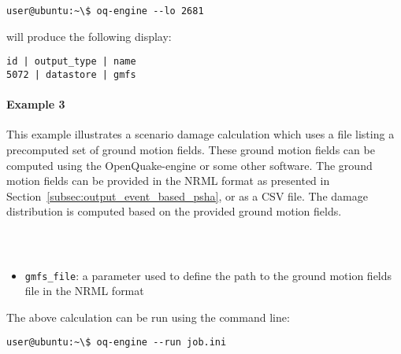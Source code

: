 \begin{Verbatim}[frame=single, commandchars=\\\{\}, samepage=true]
user@ubuntu:~\$ oq-engine --lo 2681
\end{Verbatim}

will produce the following display:

\begin{Verbatim}[frame=single, commandchars=\\\{\}, samepage=true]
  id | output_type | name
5072 | datastore | gmfs
\end{Verbatim}



\paragraph{Example 3}

This example illustrates a scenario damage calculation which uses a file
listing a precomputed set of ground motion fields. These ground motion fields
can be computed using the OpenQuake-engine or some other software. The ground
motion fields can be provided in the NRML format as presented in
Section~\ref{subsec:output_event_based_psha}, or as a CSV file. The damage
distribution is computed based on the provided ground motion fields.

\inputminted[firstline=1,firstnumber=1,fontsize=\footnotesize,frame=single,linenos,bgcolor=lightgray,label=job.ini]{ini}{oqum/risk/verbatim/config_scenario_damage_gmf.ini}\\

\begin{itemize}

  \item \Verb+gmfs_file+: a parameter used to define the path
	  to the ground motion fields file in the NRML format

\end{itemize}

The above calculation can be run using the command line:

\begin{Verbatim}[frame=single, commandchars=\\\{\}, samepage=true]
user@ubuntu:~\$ oq-engine --run job.ini
\end{Verbatim}
